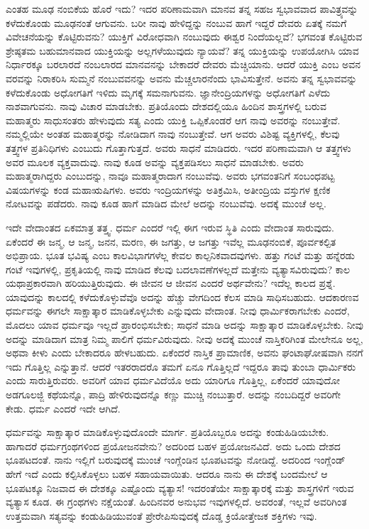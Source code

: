 ಎಂತಹ ಮೂಢ ನಂಬಿಕೆಯ ಹೊರೆ ಇದು? ಇದರ ಪರಿಣಾಮವಾಗಿ ಮಾನವ ತನ್ನ ಸಹಜ ಸ್ವಭಾವವಾದ ಪಾವಿತ್ರ್ಯವನ್ನು ಕಳೆದುಕೊಂಡು ಮೂಢನಂತೆ ಆಗುವನು. ಬರೀ ನಾವು ಹೇಳಿದ್ದನ್ನು ನಂಬುವ ಹಾಗೆ ಇದ್ದರೆ ದೇವರು ಏತಕ್ಕೆ ನಮಗೆ ವಿವೇಚನೆಯನ್ನು ಕೊಟ್ಟಿರುವನು? ಯುಕ್ತಿಗೆ ವಿರೋಧವಾಗಿ ನಂಬುವುದು ಈಶ್ವರ ನಿಂದೆಯಲ್ಲವೆ? ಭಗವಂತ ಕೊಟ್ಟಿರುವ ಶ್ರೇಷ್ಠತಮ ಬಹುಮಾನವಾದ ಯುಕ್ತಿಯನ್ನು ಅಲ್ಲಗಳೆಯುವುದು ನ್ಯಾಯವೆ? ತನ್ನ ಯುಕ್ತಿಯನ್ನು ಉಪಯೋಗಿಸಿ ಯಾವ ನಿರ್ಧಾರಕ್ಕೂ ಬರಲಾರದೆ ನಂಬಲಾರದ ಮಾನವನನ್ನು ಬೇಕಾದರೆ ದೇವರು ಮೆಚ್ಚಿಯಾನು. ಆದರೆ ಯುಕ್ತಿ ಎಂಬ ಅವನ ವರವನ್ನು ನಿರಾಕರಿಸಿ ಸುಮ್ಮನೆ ನಂಬುವವನನ್ನು ಅವನು ಮೆಚ್ಚಲಾರನೆಂದು ಭಾವಿಸುತ್ತೇನೆ. ಅವನು ತನ್ನ ಸ್ವಭಾವವನ್ನು ಕಳೆದುಕೊಂಡು ಅಧೋಗತಿಗೆ ಇಳಿದು ಮೃಗಕ್ಕೆ ಸಮನಾಗುವನು. ಜ್ಞಾನೇಂದ್ರಿಯಗಳನ್ನು ಅಧೋಗತಿಗೆ ಎಳೆದು ನಾಶವಾಗುವನು. ನಾವು ವಿಚಾರ ಮಾಡಬೇಕು. ಪ್ರತಿಯೊಂದು ದೇಶದಲ್ಲಿಯೂ ಹಿಂದಿನ ಶಾಸ್ತ್ರಗಳಲ್ಲಿ ಬರುವ ಮಹಾತ್ಮರು ಸಾಧುಸಂತರು ಹೇಳುವುದು ಸತ್ಯ ಎಂದು ಯುಕ್ತಿ ಒಪ್ಪಿಕೊಂಡರೆ ಆಗ ನಾವು ಅವರನ್ನು ನಂಬುತ್ತೇವೆ. ನಮ್ಮಲ್ಲಿಯೇ ಅಂತಹ ಮಹಾತ್ಮರನ್ನು ನೋಡಿದಾಗ ನಾವು ನಂಬುತ್ತೇವೆ. ಆಗ ಅವರು ವಿಶಿಷ್ಟ ವ್ಯಕ್ತಿಗಳಲ್ಲಿ, ಕೆಲವು ತತ್ತ್ವಗಳ ಪ್ರತಿನಿಧಿಗಳು ಎಂಬುದು ಗೊತ್ತಾಗುತ್ತದೆ. ಅವರು ಸಾಧನೆ ಮಾಡಿದರು. ಇದರ ಪರಿಣಾಮವಾಗಿ ಆ ತತ್ತ್ವಗಳು ಅವರ ಮೂಲಕ ವ್ಯಕ್ತವಾದುವು. ನಾವು ಕೂಡ ಅವನ್ನು ವ್ಯಕ್ತಪಡಿಸಲು ಸಾಧನೆ ಮಾಡಬೇಕು. ಅವರು ಮಹಾತ್ಮರಾಗಿದ್ದರು ಎಂಬುದನ್ನು, ನಾವೂ ಮಹಾತ್ಮರಾದಾಗ ನಂಬುವೆವು. ಅವರು ಭಗವಂತನಿಗೆ ಸಂಬಂಧಪಟ್ಟ ವಿಷಯಗಳನ್ನು ಕಂಡ ಮಹಾಋಷಿಗಳು. ಅವರು ಇಂದ್ರಿಯಗಳನ್ನು ಅತಿಕ್ರಮಿಸಿ, ಅತೀಂದ್ರಿಯ ವಸ್ತುಗಳ ಕ್ಷಣಿಕ ನೋಟವನ್ನು ಪಡೆದರು. ನಾವು ಕೂಡ ಹಾಗೆ ಮಾಡಿದ ಮೇಲೆ ಅದನ್ನು ನಂಬುವೆವು. ಅದಕ್ಕೆ ಮುಂಚೆ ಅಲ್ಲ.

ಇದೇ ವೇದಾಂತದ ಏಕಮಾತ್ರ ತತ್ತ್ವ. ಧರ್ಮ ಎಂದರೆ ಇಲ್ಲಿ ಈಗ ಇರುವ ಸ್ಥಿತಿ ಎಂದು ವೇದಾಂತ ಸಾರುವುದು. ಏಕೆಂದರೆ ಈ ಜನ್ಮ, ಆ ಜನ್ಮ, ಜನನ, ಮರಣ, ಈ ಜಗತ್ತು, ಆ ಜಗತ್ತು ಇವೆಲ್ಲ ಮೂಢನಂಬಿಕೆ, ಪೂರ್ವಕಲ್ಪಿತ ಅಭಿಪ್ರಾಯ. ಭೂತ ಭವಿಷ್ಯ ಎಂಬ ಕಾಲವಿಭಾಗಗಳೆಲ್ಲ ಕೇವಲ ಕಾಲ್ಪನಿಕವಾದವುಗಳು. ಹತ್ತು ಗಂಟೆ ಮತ್ತು ಹನ್ನೆರಡು ಗಂಟೆ ಇವುಗಳಲ್ಲಿ, ಪ್ರಕೃತಿಯಲ್ಲಿ ನಾವು ಮಾಡಿದ ಕೆಲವು ಬದಲಾವಣೆಗಳಲ್ಲದೆ ಮತ್ತೇನು ವ್ಯತ್ಯಾಸವಿರುವುದು? ಕಾಲ ಯಥಾಪ್ರಕಾರವಾಗಿ ಹರಿಯುತ್ತಿರುವುದು. ಈ ಜೀವನ ಆ ಜೀವನ ಎಂದರೆ ಅರ್ಥವೇನು? ಇದೆಲ್ಲ ಕಾಲದ ಪ್ರಶ್ನೆ. ಯಾವುದನ್ನು ಕಾಲದಲ್ಲಿ ಕಳೆದುಕೊಳ್ಳುವೆವೊ ಅದನ್ನು ಹೆಚ್ಚು ವೇಗದಿಂದ ಕೆಲಸ ಮಾಡಿ ಸಾಧಿಸಬಹುದು. ಆದಕಾರಣವ ಧರ್ಮವನ್ನು ಈಗಲೇ ಸಾಕ್ಷಾತ್ಕಾರ ಮಾಡಿಕೊಳ್ಳಬೇಕು ಎನ್ನುವುದು ವೇದಾಂತ. ನೀವು ಧಾರ್ಮಿಕರಾಗಬೇಕು ಎಂದರೆ, ಮೊದಲು ಯಾವ ಧರ್ಮವೂ ಇಲ್ಲದೆ ಪ್ರಾರಂಭಿಸಬೇಕು; ಸಾಧನೆ ಮಾಡಿ ಅದನ್ನು ಸಾಕ್ಷಾತ್ಕಾರ ಮಾಡಿಕೊಳ್ಳಬೇಕು. ನೀವು ಅದನ್ನು ಮಾಡಿದಾಗ ಮಾತ್ರ ನಿಮ್ಮ ಪಾಲಿಗೆ ಧರ್ಮವಿರುವುದು. ನೀವು ಅದಕ್ಕೆ ಮುಂಚೆ ನಾಸ್ತಿಕರಿಗಿಂತ ಮೇಲೇನೂ ಅಲ್ಲ, ಅಥವಾ ಕೀಳು ಎಂದು ಬೇಕಾದರೂ ಹೇಳಬಹುದು. ಏಕೆಂದರೆ ನಾಸ್ತಿಕ ಪ್ರಾಮಾಣಿಕ, ಅವನು ಘಂಟಾಘೋಷವಾಗಿ ನನಗೆ ಇದು ಗೊತ್ತಿಲ್ಲ ಎನ್ನುತ್ತಾನೆ. ಆದರೆ ಇತರರಾದರೊ ತಮಗೆ ಏನೂ ಗೊತ್ತಿಲ್ಲದೆ ಇದ್ದರೂ ತಾವು ತುಂಬಾ ಧಾರ್ಮಿಕರು ಎಂದು ಸಾರುತ್ತಿರುವರು. ಅವರಿಗೆ ಯಾವ ಧರ್ಮವಿದೆಯೊ ಅದು ಯಾರಿಗೂ ಗೊತ್ತಿಲ್ಲ, ಏಕೆಂದರೆ ಯಾವುದೋ ಅಡಗೂಲಜ್ಜಿ ಕಥೆಯನ್ನೊ, ಪಾದ್ರಿ ಹೇಳಿರುವುದನ್ನೊ ಕಣ್ಣು ಮುಚ್ಚಿ ನಂಬುತ್ತಾರೆ. ಅದನ್ನು ನಂಬದಿದ್ದರೆ ಅವರಿಗೇ ಕೇಡು. ಧರ್ಮ ಎಂದರೆ ಇದೇ ಆಗಿದೆ.

ಧರ್ಮವನ್ನು ಸಾಕ್ಷಾತ್ಕಾರ ಮಾಡಿಕೊಳ್ಳುವುದೊಂದೇ ಮಾರ್ಗ. ಪ್ರತಿಯೊಬ್ಬರೂ ಅದನ್ನು ಕಂಡುಹಿಡಿಯಬೇಕು. ಹಾಗಾದರೆ ಧರ್ಮಗ್ರಂಥಗಳಿಂದ ಪ್ರಯೋಜನವೇನು? ಅದರಿಂದ ಬಹಳ ಪ್ರಯೋಜನವಿದೆ. ಅದು ಒಂದು ದೇಶದ ಭೂಪಟದಂತೆ. ನಾನು ಇಲ್ಲಿಗೆ ಬರುವುದಕ್ಕೆ ಮುಂಚೆ ಇಂಗ್ಲೆಂಡಿನ ಭೂಪಟವನ್ನು ನೋಡಿದ್ದೆ. ಅದರಿಂದ ಇಂಗ್ಲೆಂಡ್ ಹೇಗೆ ಇದೆ ಎಂದು ಕಲ್ಪಿಸಿಕೊಳ್ಳಲು ಬಹಳ ಸಹಾಯವಾಯಿತು. ಆದರೂ ನಾನು ಈ ದೇಶಕ್ಕೆ ಬಂದಮೇಲೆ ಆ ಭೂಪಟಕ್ಕೂ ನಿಜವಾದ ಈ ದೇಶಕ್ಕೂ ಎಷ್ಟೊಂದು ವ್ಯತ್ಯಾಸ! ಇದರಂತೆಯೇ ಸಾಕ್ಷಾತ್ಕಾರಕ್ಕೆ ಮತ್ತು ಶಾಸ್ತ್ರಗಳಿಗೆ ಇರುವ ವ್ಯತ್ಯಾಸ ಕೂಡ. ಈ ಗ್ರಂಥಗಳು ನಕ್ಷೆಯಂತೆ. ಹಿಂದಿನವರ ಅನುಭವ ಇವುಗಳಲ್ಲಿದೆ. ಅವರಂತೆ, ಇಲ್ಲವೆ ಅವರಿಗಿಂತ ಉತ್ತಮವಾಗಿ ಸತ್ಯವನ್ನು ಕಂಡುಹಿಡಿಯುವಂತೆ ಪ್ರೇರೇಪಿಸುವುದಕ್ಕೆ ದೊಡ್ಡ ಕ್ರಿಯೋತ್ತೇಜಕ ಶಕ್ತಿಗಳು ಇವು.

